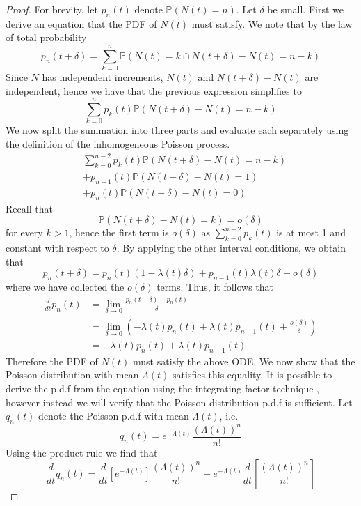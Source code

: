 \begin{proof}
	For brevity, let $p_n(t)$ denote $\mathbb{P}(N(t) = n)$. Let $\delta$ be small.
	First we derive an equation that the PDF of $N(t)$ must satisfy.
	We note that by the law of total probability
	$$
		p_n(t+\delta) = \sum_{k=0}^n \mathbb{P}(N(t) = k \cap N(t + \delta) - N(t) = n - k) 
	$$
	Since $N$ has independent increments, $N(t)$ and $N(t + \delta) - N(t)$ are independent, hence we have that the previous expression simplifies to
	$$
		\sum_{k=0}^n p_k(t) \mathbb{P}(N(t + \delta) - N(t) = n - k) 
	$$
	We now split the summation into three parts and evaluate each separately using the definition of the inhomogeneous Poisson process.
	\begin{align*}
		&\sum_{k=0}^{n-2} p_k(t) \mathbb{P}(N(t + \delta) - N(t) = n - k) \\ 
		&+ p_{n-1}(t) \mathbb{P}(N(t + \delta) - N(t) = 1) \\
		&+ p_n(t) \mathbb{P}(N(t + \delta) - N(t) = 0) 
	\end{align*}
	Recall that
	$$
		\mathbb{P}(N(t + \delta) - N(t) = k) 
		= o(\delta)
	$$
	for every $k > 1$, hence the first term is $o(\delta)$ as $\sum_{k=0}^{n-2} p_k(t)$ is at most 1 and constant with respect to $\delta$.  
	By applying the other interval conditions, we obtain that
	$$
		p_n(t+\delta) = p_n(t)(1-\lambda(t)\delta) + p_{n-1}(t)\lambda(t)\delta + o(\delta)
	$$
	where we have collected the $o(\delta)$ terms.
	Thus, it follows that
	\begin{align*}
		\frac{d}{dt} p_n(t) 
		&= \lim_{\delta \to 0} \frac{p_n(t+\delta) - p_n(t)}{\delta} \\
		&= \lim_{\delta \to 0} \left( -\lambda(t)p_n(t) + \lambda(t)p_{n-1}(t) + \frac{o(\delta)}{\delta} \right)\\
		&= -\lambda(t)p_n(t) + \lambda(t)p_{n-1}(t)
	\end{align*}
	Therefore the PDF of $N(t)$ must satisfy the above ODE. 
	We now show that the Poisson distribution with mean $\Lambda(t)$
	satisfies this equality. It is possible to derive the p.d.f from the equation using the integrating factor technique \cite{inhomoPoissonProof}, however instead we will verify that the Poisson distribution p.d.f is sufficient.
	Let $q_n(t)$ denote the Poisson p.d.f with mean $\Lambda(t)$, i.e.
	$$
		q_n(t)
		= e^{-\Lambda (t)}\frac{(\Lambda(t))^n}{n!}
	$$
	Using the product rule we find that 
	$$
		\frac{d}{dt} q_n(t) 
		= \frac{d}{dt} \left[ e^{-\Lambda (t)}\right] \frac{(\Lambda(t))^n}{n!} + e^{-\Lambda (t)} \frac{d}{dt} \left[ \frac{(\Lambda(t))^n}{n!} \right]
$$
\end{proof}

